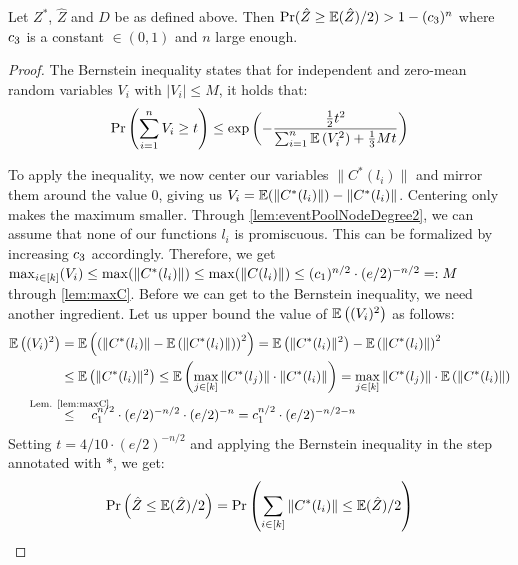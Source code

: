 \documentclass[a4paper,USenglish,cleveref]{lipics-v2021}
\def\refRelLem#1#2{\stackrel{\mathclap{\text{Lem. \ref{#1}}}}{#2}\quad}
\begin{document}
\begin{lemma}
  Let $Z^*$, $\hat Z$ and $D$ be as defined above.
  Then $\Pr(\hat Z \geq \mathbb{E}(\hat Z)/2) > 1-(c_3)^n$ where $c_3$ is a constant $\in (0, 1)$ and $n$ large enough.
  \label{lem:sConcentration}
\end{lemma}
\begin{proof}
  The Bernstein inequality \cite{bernstein1924modification} states that for independent and zero-mean random variables $V_i$ with $|V_i| \leq M$, it holds that:
  \begin{align*}
    \Pr\left(\sum_{i=1}^n V_i \geq t \right)
      \leq \exp \left( -\frac{\tfrac{1}{2} t^2}{\sum_{i = 1}^n \mathbb{E}\left(V_i^2 \right)+\tfrac{1}{3} Mt} \right)
  \end{align*}

  To apply the inequality, we now center our variables $\|C^*(l_i)\|$ and mirror them around the value $0$, giving us $V_i=\mathbb{E}(\|C^*(l_i)\|)-\|C^*(l_i)\|$.
  Centering only makes the maximum smaller.
  Through \cref{lem:eventPoolNodeDegree2}, we can assume that none of our functions $l_i$ is promiscuous.
  This can be formalized by increasing $c_3$ accordingly.
  Therefore, we get $\max_{i \in [k]}(V_i) \leq \max(\|C^*(l_i)\|) \leq \max(\|C(l_i)\|) \leq (c_1)^{n/2} \cdot (e/2)^{-n/2} =: M$ through \cref{lem:maxC}.
  Before we can get to the Bernstein inequality, we need another ingredient.
  Let us upper bound the value of $\mathbb{E}\left((V_i)^2 \right)$ as follows:
  \begin{align*}
    \expect\left((V_i)^2 \right)
      &= \expect\left(\left(\|C^*(l_i)\|-\expect\left(\|C^*(l_i)\|\right)\right)^2 \right)
      = \expect\left(\|C^*(l_i)\|^2\right)-\expect\left(\|C^*(l_i)\|\right)^2\\
      &\leq \expect\left(\|C^*(l_i)\|^2\right)
      \leq \expect\left(\max_{j \in [k]}\|C^*(l_j)\| \cdot \|C^*(l_i)\|\right)
      = \max_{j \in [k]}\|C^*(l_j)\| \cdot \expect\left(\|C^*(l_i)\|\right)\\
      &\refRelLem{lem:maxC}{\leq} \constantMaxC^{n/2} \cdot (e/2)^{-n/2} \cdot (e/2)^{-n}
      = \constantMaxC^{n/2} \cdot (e/2)^{-n/2-n}
  \end{align*}
  Setting $t = 4/10 \cdot (e/2)^{-n/2}$ and applying the Bernstein inequality in the step annotated with $*$, we get:
  \begin{align*}
    \Pr&\left(\hat Z \leq \expect(\hat Z)/2\right)
      =\Pr\left(\sum_{i \in [k]} \|C^*(l_i)\| \leq \expect(\hat Z)/2\right)\\

\end{align*}
\end{proof}
\end{document}
